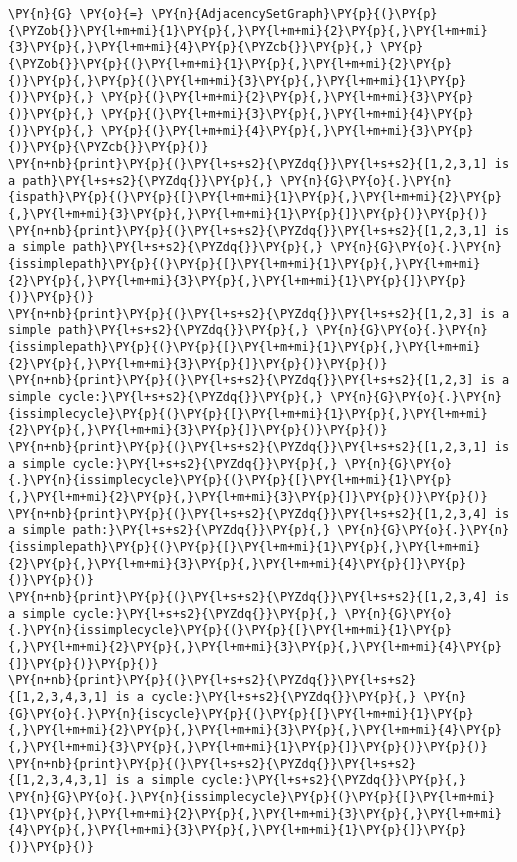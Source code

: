 \begin{Verbatim}[commandchars=\\\{\}]
\PY{n}{G} \PY{o}{=} \PY{n}{AdjacencySetGraph}\PY{p}{(}\PY{p}{\PYZob{}}\PY{l+m+mi}{1}\PY{p}{,}\PY{l+m+mi}{2}\PY{p}{,}\PY{l+m+mi}{3}\PY{p}{,}\PY{l+m+mi}{4}\PY{p}{\PYZcb{}}\PY{p}{,} \PY{p}{\PYZob{}}\PY{p}{(}\PY{l+m+mi}{1}\PY{p}{,}\PY{l+m+mi}{2}\PY{p}{)}\PY{p}{,}\PY{p}{(}\PY{l+m+mi}{3}\PY{p}{,}\PY{l+m+mi}{1}\PY{p}{)}\PY{p}{,} \PY{p}{(}\PY{l+m+mi}{2}\PY{p}{,}\PY{l+m+mi}{3}\PY{p}{)}\PY{p}{,} \PY{p}{(}\PY{l+m+mi}{3}\PY{p}{,}\PY{l+m+mi}{4}\PY{p}{)}\PY{p}{,} \PY{p}{(}\PY{l+m+mi}{4}\PY{p}{,}\PY{l+m+mi}{3}\PY{p}{)}\PY{p}{\PYZcb{}}\PY{p}{)}
\PY{n+nb}{print}\PY{p}{(}\PY{l+s+s2}{\PYZdq{}}\PY{l+s+s2}{[1,2,3,1] is a path}\PY{l+s+s2}{\PYZdq{}}\PY{p}{,} \PY{n}{G}\PY{o}{.}\PY{n}{ispath}\PY{p}{(}\PY{p}{[}\PY{l+m+mi}{1}\PY{p}{,}\PY{l+m+mi}{2}\PY{p}{,}\PY{l+m+mi}{3}\PY{p}{,}\PY{l+m+mi}{1}\PY{p}{]}\PY{p}{)}\PY{p}{)}
\PY{n+nb}{print}\PY{p}{(}\PY{l+s+s2}{\PYZdq{}}\PY{l+s+s2}{[1,2,3,1] is a simple path}\PY{l+s+s2}{\PYZdq{}}\PY{p}{,} \PY{n}{G}\PY{o}{.}\PY{n}{issimplepath}\PY{p}{(}\PY{p}{[}\PY{l+m+mi}{1}\PY{p}{,}\PY{l+m+mi}{2}\PY{p}{,}\PY{l+m+mi}{3}\PY{p}{,}\PY{l+m+mi}{1}\PY{p}{]}\PY{p}{)}\PY{p}{)}
\PY{n+nb}{print}\PY{p}{(}\PY{l+s+s2}{\PYZdq{}}\PY{l+s+s2}{[1,2,3] is a simple path}\PY{l+s+s2}{\PYZdq{}}\PY{p}{,} \PY{n}{G}\PY{o}{.}\PY{n}{issimplepath}\PY{p}{(}\PY{p}{[}\PY{l+m+mi}{1}\PY{p}{,}\PY{l+m+mi}{2}\PY{p}{,}\PY{l+m+mi}{3}\PY{p}{]}\PY{p}{)}\PY{p}{)}
\PY{n+nb}{print}\PY{p}{(}\PY{l+s+s2}{\PYZdq{}}\PY{l+s+s2}{[1,2,3] is a simple cycle:}\PY{l+s+s2}{\PYZdq{}}\PY{p}{,} \PY{n}{G}\PY{o}{.}\PY{n}{issimplecycle}\PY{p}{(}\PY{p}{[}\PY{l+m+mi}{1}\PY{p}{,}\PY{l+m+mi}{2}\PY{p}{,}\PY{l+m+mi}{3}\PY{p}{]}\PY{p}{)}\PY{p}{)}
\PY{n+nb}{print}\PY{p}{(}\PY{l+s+s2}{\PYZdq{}}\PY{l+s+s2}{[1,2,3,1] is a simple cycle:}\PY{l+s+s2}{\PYZdq{}}\PY{p}{,} \PY{n}{G}\PY{o}{.}\PY{n}{issimplecycle}\PY{p}{(}\PY{p}{[}\PY{l+m+mi}{1}\PY{p}{,}\PY{l+m+mi}{2}\PY{p}{,}\PY{l+m+mi}{3}\PY{p}{]}\PY{p}{)}\PY{p}{)}
\PY{n+nb}{print}\PY{p}{(}\PY{l+s+s2}{\PYZdq{}}\PY{l+s+s2}{[1,2,3,4] is a simple path:}\PY{l+s+s2}{\PYZdq{}}\PY{p}{,} \PY{n}{G}\PY{o}{.}\PY{n}{issimplepath}\PY{p}{(}\PY{p}{[}\PY{l+m+mi}{1}\PY{p}{,}\PY{l+m+mi}{2}\PY{p}{,}\PY{l+m+mi}{3}\PY{p}{,}\PY{l+m+mi}{4}\PY{p}{]}\PY{p}{)}\PY{p}{)}
\PY{n+nb}{print}\PY{p}{(}\PY{l+s+s2}{\PYZdq{}}\PY{l+s+s2}{[1,2,3,4] is a simple cycle:}\PY{l+s+s2}{\PYZdq{}}\PY{p}{,} \PY{n}{G}\PY{o}{.}\PY{n}{issimplecycle}\PY{p}{(}\PY{p}{[}\PY{l+m+mi}{1}\PY{p}{,}\PY{l+m+mi}{2}\PY{p}{,}\PY{l+m+mi}{3}\PY{p}{,}\PY{l+m+mi}{4}\PY{p}{]}\PY{p}{)}\PY{p}{)}
\PY{n+nb}{print}\PY{p}{(}\PY{l+s+s2}{\PYZdq{}}\PY{l+s+s2}{[1,2,3,4,3,1] is a cycle:}\PY{l+s+s2}{\PYZdq{}}\PY{p}{,} \PY{n}{G}\PY{o}{.}\PY{n}{iscycle}\PY{p}{(}\PY{p}{[}\PY{l+m+mi}{1}\PY{p}{,}\PY{l+m+mi}{2}\PY{p}{,}\PY{l+m+mi}{3}\PY{p}{,}\PY{l+m+mi}{4}\PY{p}{,}\PY{l+m+mi}{3}\PY{p}{,}\PY{l+m+mi}{1}\PY{p}{]}\PY{p}{)}\PY{p}{)}
\PY{n+nb}{print}\PY{p}{(}\PY{l+s+s2}{\PYZdq{}}\PY{l+s+s2}{[1,2,3,4,3,1] is a simple cycle:}\PY{l+s+s2}{\PYZdq{}}\PY{p}{,} \PY{n}{G}\PY{o}{.}\PY{n}{issimplecycle}\PY{p}{(}\PY{p}{[}\PY{l+m+mi}{1}\PY{p}{,}\PY{l+m+mi}{2}\PY{p}{,}\PY{l+m+mi}{3}\PY{p}{,}\PY{l+m+mi}{4}\PY{p}{,}\PY{l+m+mi}{3}\PY{p}{,}\PY{l+m+mi}{1}\PY{p}{]}\PY{p}{)}\PY{p}{)}
\end{Verbatim}

